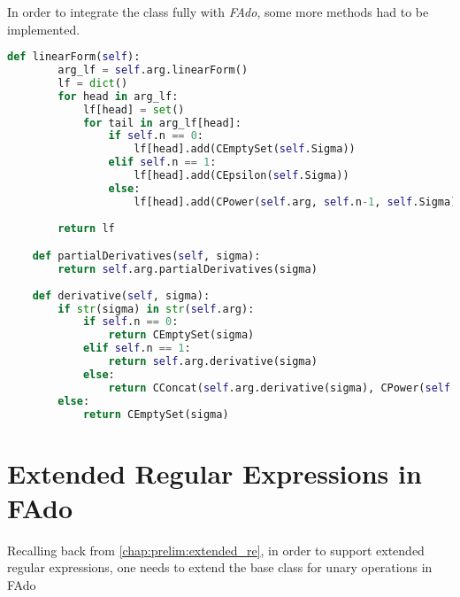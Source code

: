 In order to integrate the class fully with \textit{FAdo}, some more methods had to be implemented.

\begin{lstlisting}[language=Python]
	def linearForm(self):
		arg_lf = self.arg.linearForm()
		lf = dict()
		for head in arg_lf:
			lf[head] = set()
			for tail in arg_lf[head]:
				if self.n == 0:
					lf[head].add(CEmptySet(self.Sigma))
				elif self.n == 1:
					lf[head].add(CEpsilon(self.Sigma))
				else:
					lf[head].add(CPower(self.arg, self.n-1, self.Sigma))
	
		return lf

	def partialDerivatives(self, sigma):
		return self.arg.partialDerivatives(sigma)
	
	def derivative(self, sigma):
		if str(sigma) in str(self.arg):
			if self.n == 0:
				return CEmptySet(sigma)
			elif self.n == 1:
				return self.arg.derivative(sigma)
			else:
				return CConcat(self.arg.derivative(sigma), CPower(self.arg, self.n-1, self.Sigma))
		else:
			return CEmptySet(sigma)
\end{lstlisting}



\section{Extended Regular Expressions in FAdo}
Recalling back from \ref{chap:prelim:extended_re}, in order to support extended regular expressions, one needs to extend the base class for unary operations in FAdo